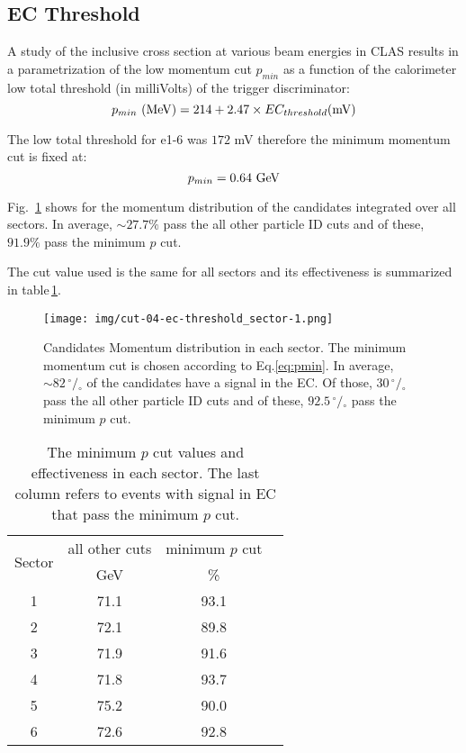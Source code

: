 \clearpage\newpage
\subsection{EC Threshold}
A study \cite{bib:ecmin} of the inclusive cross section at various beam energies in CLAS 
results in a parametrization of the low momentum cut $p_{min}$ as a function of
the calorimeter low total threshold (in milliVolts) of the trigger discriminator:
\begin{equation}
 \label{eq:pmin} 
 p_{min}\,\,{\rm (MeV)} = 214 + 2.47\times EC_{threshold}{\rm (mV)}
\end{equation}

The low total threshold for e1-6 was $172$ mV therefore the minimum momentum cut is fixed at:
$$
p_{min} = 0.64\,\,{\rm GeV}
$$

Fig.~\ref{fig:pmincut_alls} shows for the momentum distribution of the candidates integrated
over all sectors. In average, $\sim 27.7\%$  pass the all other particle ID
cuts and of these, $91.9\%$ pass the minimum $p$ cut.

The cut value used is the same for all sectors and its effectiveness is summarized in 
table\,\ref{tab:pmincut}.


\begin{figure}[ht]
  \centering
		\texttt{[image: img/cut-04-ec-threshold\_sector-1.png]}
		\caption{Candidates Momentum distribution in each sector. The minimum momentum cut is
               chosen according to Eq.\ref{eq:pmin}. In average, $\sim 82 \,^{\circ\!\!}/\!_\circ$ 
					of the candidates have a signal in the EC. Of those, $30 \,^{\circ\!\!}/\!_\circ$
					pass the all other particle ID cuts and of these, $92.5 \,^{\circ\!\!}/\!_\circ$
					pass the minimum $p$ cut.}
 		\label{fig:pmincut_alls}
\end{figure}

\clearpage



\begin{table}[h]
\label{tab:pmincut}
	\begin{center}
		\begin{tabular}{c | c | c | c}
			\hline 
			\multirow{2}{*}{Sector} 
					& all other cuts & minimum $p$ cut \\
					&  GeV & \% &  \\
			\hline 
			1   & 71.1 & 93.1 \\
			2   & 72.1 & 89.8 \\
			3   & 71.9 & 91.6 \\
			4   & 71.8 & 93.7 \\
			5   & 75.2 & 90.0 \\
			6   & 72.6 & 92.8 \\
			\hline
		\end{tabular}
		\caption{The minimum $p$ cut values and effectiveness in each sector.
					The last column refers to events with signal in EC that pass the 
 					minimum $p$ cut.}	
	
	\end{center}
\end{table}


